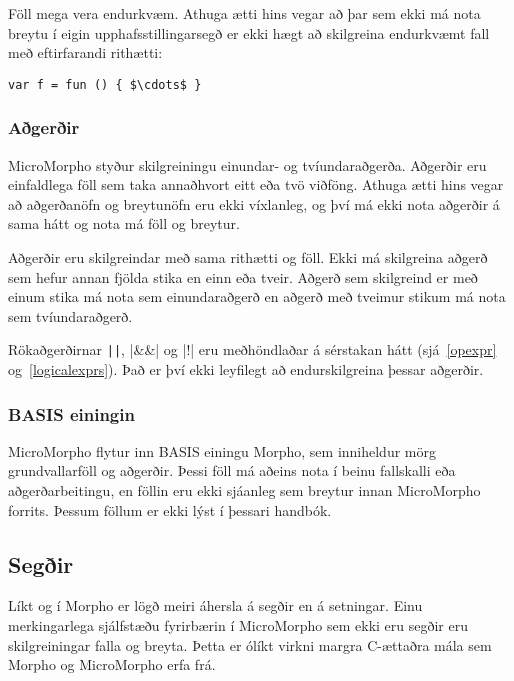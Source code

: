 \documentclass[12pt]{article}
\begin{document}
Föll mega vera endurkvæm. Athuga ætti hins vegar að
þar sem ekki má nota breytu í eigin upphafsstillingarsegð
er ekki hægt að skilgreina endurkvæmt fall með eftirfarandi rithætti:

\begin{mdframed}[style=langframe]
\begin{Verbatim}[commandchars=\\?!,codes={\catcode`$=3\catcode`^=7}]
var f = fun () { $\cdots$ }
\end{Verbatim}
\end{mdframed}

\subsubsection{Aðgerðir}
MicroMorpho styður skilgreiningu einundar- og tvíundaraðgerða.
Aðgerðir eru einfaldlega föll sem taka annaðhvort eitt eða tvö viðföng.
Athuga ætti hins vegar að aðgerðanöfn og breytunöfn eru ekki víxlanleg,
og því má ekki nota aðgerðir á sama hátt og nota má föll og breytur.

Aðgerðir eru skilgreindar með sama rithætti og föll.
Ekki má skilgreina aðgerð sem hefur annan fjölda stika en einn eða tveir.
Aðgerð sem skilgreind er með einum stika má nota sem einundaraðgerð
en aðgerð með tveimur stikum má nota sem tvíundaraðgerð.

Rökaðgerðirnar \verb/||/, |&&| og |!| eru meðhöndlaðar á sérstakan hátt
(sjá~\ref{opexpr} og~\ref{logicalexprs}). Það er því ekki leyfilegt að endurskilgreina þessar aðgerðir.

\subsubsection{BASIS einingin}
MicroMorpho flytur inn BASIS einingu Morpho, sem inniheldur mörg grundvallarföll og aðgerðir.
Þessi föll má aðeins nota í beinu fallskalli eða aðgerðarbeitingu,
en föllin eru ekki sjáanleg sem breytur innan MicroMorpho forrits.
Þessum föllum er ekki lýst í þessari handbók.

\subsection{Segðir}\label{exprs}
Líkt og í Morpho er lögð meiri áhersla á segðir en á setningar.
Einu merkingarlega sjálfstæðu fyrirbærin í MicroMorpho sem ekki eru segðir eru
skilgreiningar falla og breyta.
Þetta er ólíkt virkni margra C-ættaðra mála sem Morpho og MicroMorpho erfa frá.
\end{document}
